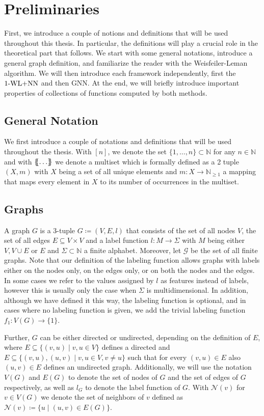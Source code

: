 \section{Preliminaries}\label{sec:pre_lim}
First, we introduce a couple of notions and definitions that will be used throughout this thesis. In particular, the definitions will play a crucial role in the theoretical part that follows. We start with some general notations, introduce a general graph definition, and familiarize the reader with the Weisfeiler-Leman algorithm. We will then introduce each framework independently, first the $\text{1-WL+NN}$ and then GNN. At the end, we will briefly introduce important properties of collections of functions computed by both methods.

\subsection{General Notation}
We first introduce a couple of notations and definitions that will be used throughout the thesis. With $[n]$, we denote the set $\{1, \ldots, n\} \subset \mathbb{N}$ for any $n \in \mathbb{N}$ and with $\{\!\!\{ \ldots \}\!\!\}$ we denote a multiset which is formally defined as a 2 tuple $(X, m)$ with $X$ being a set of all unique elements and $m: X \rightarrow \mathbb{N}_{\geq 1}$ a mapping that maps every element in $X$ to its number of occurrences in the multiset.

\subsection{Graphs}
A graph $G$ is a 3-tuple $G\coloneqq (V, E, l)$ that consists of the set of all nodes $V$, the set of all edges $E \subseteq V \times V$ and a label function $l: M \rightarrow \Sigma$ with $M$ being either $V, V \cup E$ or $E$ and $\Sigma \subset \mathbb{N}$ a finite alphabet. Moreover, let $\mathcal{G}$ be the set of all finite graphs. Note that our definition of the labeling function allows graphs with labels either on the nodes only, on the edges only, or on both the nodes and the edges. In some cases we refer to the values assigned by $l$ as features instead of labels, however this is usually only the case when $\Sigma$ is multidimensional. In addition, although we have defined it this way, the labeling function is optional, and in cases where no labeling function is given, we add the trivial labeling function $f_1: V(G) \rightarrow \{1\}$.

Further, $G$ can be either directed or undirected, depending on the definition of $E$, where $E \subseteq \{(v,u) \mid v,u \in V\}$ defines a directed and $E \subseteq \{(v, u), (u,v) \mid v,u \in V, v\neq u\}$ such that for every $(v,u) \in E$ also $(u,v) \in E$ defines an undirected graph. Additionally, we will use the notation $V(G)$ and $E(G)$ to denote the set of nodes of $G$ and the set of edges of $G$ respectively, as well as $l_G$ to denote the label function of $G$. With $\mathcal{N}(v)$ for $v \in V(G)$ we denote the set of neighbors of $v$ defined as $\mathcal{N}(v) \coloneqq \{u \mid (u, v) \in E(G)\}$.


